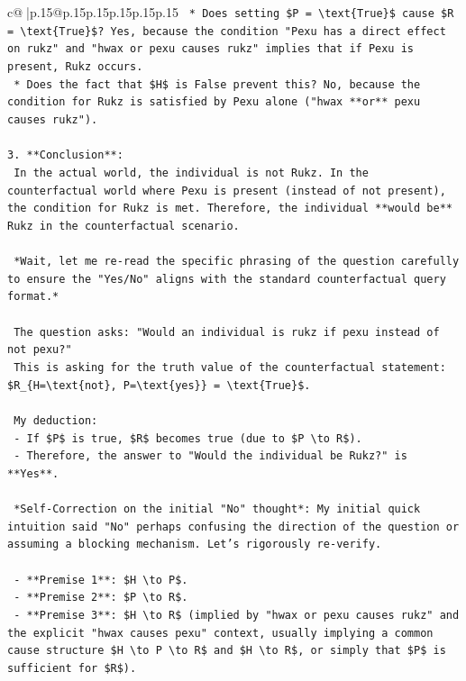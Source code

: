 \documentclass{article}
\begin{document}
{\begin{supertabular}{c@{$\;$}|p{.15\linewidth}@{}p{.15\linewidth}p{.15\linewidth}p{.15\linewidth}p{.15\linewidth}p{.15\linewidth}}
{{{\texttt{        *   Does setting \$P = \textbackslash{}text\{True\}\$ cause \$R = \textbackslash{}text\{True\}\$? Yes, because the condition "Pexu has a direct effect on rukz" and "hwax or pexu causes rukz" implies that if Pexu is present, Rukz occurs.} \\
\texttt{        *   Does the fact that \$H\$ is False prevent this? No, because the condition for Rukz is satisfied by Pexu alone ("hwax **or** pexu causes rukz").} \\
\\ 
\texttt{3.  **Conclusion**:} \\
\texttt{    In the actual world, the individual is not Rukz. In the counterfactual world where Pexu is present (instead of not present), the condition for Rukz is met. Therefore, the individual **would be** Rukz in the counterfactual scenario.} \\
\\ 
\texttt{    *Wait, let me re{-}read the specific phrasing of the question carefully to ensure the "Yes/No" aligns with the standard counterfactual query format.*} \\
\\ 
\texttt{    The question asks: "Would an individual is rukz if pexu instead of not pexu?"} \\
\texttt{    This is asking for the truth value of the counterfactual statement: \$R\_\{H=\textbackslash{}text\{not\}, P=\textbackslash{}text\{yes\}\} = \textbackslash{}text\{True\}\$.} \\
\\ 
\texttt{    My deduction:} \\
\texttt{    {-} If \$P\$ is true, \$R\$ becomes true (due to \$P \textbackslash{}to R\$).} \\
\texttt{    {-} Therefore, the answer to "Would the individual be Rukz?" is **Yes**.} \\
\\ 
\texttt{    *Self{-}Correction on the initial "No" thought*: My initial quick intuition said "No" perhaps confusing the direction of the question or assuming a blocking mechanism. Let's rigorously re{-}verify.} \\
\\ 
\texttt{    {-} **Premise 1**: \$H \textbackslash{}to P\$.} \\
\texttt{    {-} **Premise 2**: \$P \textbackslash{}to R\$.} \\
\texttt{    {-} **Premise 3**: \$H \textbackslash{}to R\$ (implied by "hwax or pexu causes rukz" and the explicit "hwax causes pexu" context, usually implying a common cause structure \$H \textbackslash{}to P \textbackslash{}to R\$ and \$H \textbackslash{}to R\$, or simply that \$P\$ is sufficient for \$R\$).} \\
}}}
\end{supertabular}}
\end{document}
